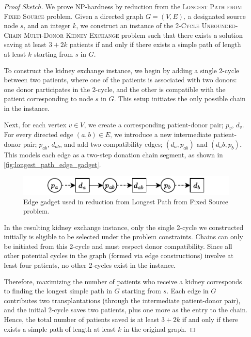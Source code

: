 \begin{proof}[Proof Sketch]
We prove NP-hardness by reduction from the \textsc{Longest Path from Fixed Source} problem. Given a directed graph $G = (V, E)$, a designated source node $s$, and an integer $k$, we construct an instance of the \textsc{2-Cycle Unbounded-Chain Multi-Donor Kidney Exchange} problem such that there exists a solution saving at least $3 + 2k$ patients if and only if there exists a simple path of length at least $k$ starting from $s$ in $G$.

To construct the kidney exchange instance, we begin by adding a single 2-cycle between two patients, where one of the patients is associated with two donors: one donor participates in the 2-cycle, and the other is compatible with the patient corresponding to node $s$ in $G$. This setup initiates the only possible chain in the instance.

Next, for each vertex $v \in V$, we create a corresponding patient-donor pair; $p_v$, $d_v$. For every directed edge $(a, b) \in E$, we introduce a new intermediate patient-donor pair; $p_{ab}$, $d_{ab}$, and add two compatibility edges; $(d_a, p_{ab})$ and $(d_ab, p_b)$. This models each edge as a two-step donation chain segment, as shown in \autoref{fig:longest_path_edge_gadget}.


\begin{figure}
    \centering
    \includegraphics{data/longest_path_edge_gadget.pdf}
    \caption[Edge gadget used in reduction from Longest Path from Fixed Source problem.]{Edge gadget used in reduction from Longest Path from Fixed Source problem.}
    \label{fig:longest_path_edge_gadget}
\end{figure}


In the resulting kidney exchange instance, only the single 2-cycle we constructed initially is eligible to be selected under the problem constraints. Chains can only be initiated from this 2-cycle and must respect donor compatibility. Since all other potential cycles in the graph (formed via edge constructions) involve at least four patients, no other 2-cycles exist in the instance.

Therefore, maximizing the number of patients who receive a kidney corresponds to finding the longest simple path in $G$ starting from $s$. Each edge in $G$ contributes two transplantations (through the intermediate patient-donor pair), and the initial 2-cycle saves two patients, plus one more as the entry to the chain. Hence, the total number of patients saved is at least $3 + 2k$ if and only if there exists a simple path of length at least $k$ in the original graph.


\end{proof}
